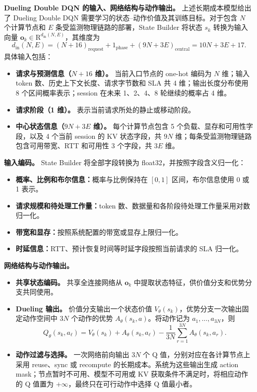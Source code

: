 \begin{changehighlight}
\noindent\textbf{Dueling Double DQN 的输入、网络结构与动作输出。}
上述长期成本模型给出了 Dueling Double DQN 需要学习的状态--动作价值及其训练目标。对于包含 \(N\) 个计算节点和 \(E\) 条受监测物理链路的部署，State Builder 将状态 \(s_k\) 转换为输入向量 \(\mathbf o_k\in\mathrm R^{d_{\mathrm{in}}(N,E)}\)，其维度为
\[
d_{\mathrm{in}}(N,E)
=
(N+16)_{\mathrm{request}}
+1_{\mathrm{phase}}
+(9N+3E)_{\mathrm{central}}
=10N+3E+17.
\]
具体输入包括：
\begin{itemize}
    \item \textbf{请求与预测信息（\(N+16\) 维）。} 当前入口节点的 one-hot 编码为 \(N\) 维；输入 token 数、历史上下文长度、请求字节数和 SLA 共 4 维；输出长度分布使用 8 个区间概率表示；session 在未来 1、2、4、8 轮继续的概率占 4 维。
    \item \textbf{请求阶段（1 维）。} 表示当前请求所处的静止或移动阶段。
    \item \textbf{中心状态信息（\(9N+3E\) 维）。} 每个计算节点包含 5 个负载、显存和可用性字段，以及 4 个当前 session 的 KV 状态字段，共 \(9N\) 维；每条受监测物理链路包含可用带宽、RTT 和可用性 3 个字段，共 \(3E\) 维。
\end{itemize}

\textbf{输入编码。} State Builder 将全部字段转换为 float32，并按照字段含义归一化：
\begin{itemize}
    \item \textbf{概率、比例和布尔信息：}概率与比例保持在 \([0,1]\) 区间，布尔信息使用 0 或 1 表示。
    \item \textbf{请求规模和待处理工作量：}token 数、数据量和各阶段待处理工作量采用对数归一化。
    \item \textbf{带宽和显存：}按照系统配置的带宽或显存上限归一化。
    \item \textbf{时延信息：}RTT、预计恢复时间等时延字段按照当前请求的 SLA 归一化。
\end{itemize}

\textbf{网络结构与动作输出。}
\begin{itemize}
    \item \textbf{共享状态编码。} 共享全连接网络从 \(\mathbf o_k\) 中提取状态特征，供价值分支和优势分支共同使用。
    \item \textbf{Dueling 输出。} 价值分支输出一个状态价值 \(V_\theta(s_k)\)，优势分支一次输出固定动作空间中 \(3N\) 个动作的优势 \(A_\theta(s_k,a)\)。将动作记为 \(a_1,\ldots,a_{3N}\)，则
    \[
    Q_\theta(s_k,a_\ell)
    =
    V_\theta(s_k)+A_\theta(s_k,a_\ell)
    -\frac{1}{3N}\sum_{r=1}^{3N}A_\theta(s_k,a_r).
    \]
    \item \textbf{动作过滤与选择。} 一次网络前向输出 \(3N\) 个 Q 值，分别对应在各计算节点上采用 reuse、sync 或 recompute 的长期成本。系统为这些输出生成 action mask；节点暂时不可用、模型不可用或 KV 获取条件不满足时，将相应动作的 Q 值置为 \(+\infty\)，最终只在可行动作中选择 Q 值最小者。
\end{itemize}
\end{changehighlight}

